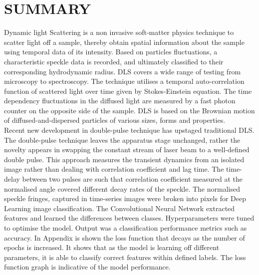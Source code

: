 \chapter{SUMMARY}

Dynamic light Scattering is a non invasive soft-matter physics technique to scatter light off a sample, thereby obtain spatial information about the sample using temporal data of its intensity. Based on particles fluctuations, a characteristic speckle data is recorded, and ultimately classified to their corresponding hydrodynamic radius. DLS covers a wide range of testing from microscopy to spectroscopy. The technique utilises a temporal auto-correlation function of scattered light over time given by Stokes-Einstein equation. The time dependency fluctuations in the diffused light are measured by a fast photon counter on the opposite side of the sample. DLS is based on the Brownian motion of diffused-and-dispersed particles of various sizes, forms and properties. \\

Recent new development in double-pulse technique has upstaged traditional DLS. The double-pulse technique leaves the apparatus stage unchanged, rather the novelty appears in swapping the constant stream of laser beam to a well-defined double pulse. This approach measures the transient dynamics from an isolated image rather than dealing with correlation coefficient and lag time. The time-delay between two pulses are such that correlation coefficient measured at the normalised angle covered different decay rates of the speckle. The normalised speckle fringes, captured in time-series images were broken into pixels for Deep Learning image classification. The Convolutional Neural Network extracted features and learned the differences between classes. Hyperparameters were tuned to optimise the model. Output was a classification performance metrics such as accuracy. In Appendix is shown the loss function that decays as the number of epochs is increased. It shows that as the model is learning off different parameters, it is able to classify correct features within defined labels. The loss function graph is indicative of the model performance.\\ 

